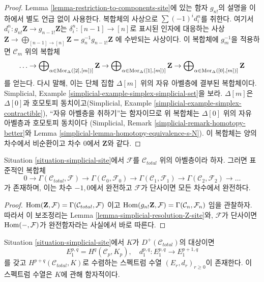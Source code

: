 \begin{proof}
Lemma \ref{lemma-restriction-to-components-site}에 있는 함자 $g_{n!}$의
설명을 이하에서 별도 언급 없이 사용한다. 복합체의 사상으로
$\sum (-1)^i d^n_i$를 취한다. 여기서
$d^n_i : g_{n!}\mathbf{Z} \to g_{n - 1!}\mathbf{Z}$는
$\delta^n_i : [n - 1] \to [n]$로 표시된 인자에 대응하는 사상
$\mathbf{Z} \to
\bigoplus_{[n - 1] \to [n]} \mathbf{Z} = g_n^{-1}g_{n - 1!}\mathbf{Z}$
에 수반되는 사상이다. 이 복합체에 $g_m^{-1}$을 적용하면
$\mathcal{C}_m$ 위의 복합체
$$
\ldots \to
\bigoplus\nolimits_{\alpha \in \mathop{\mathrm{Mor}}\nolimits_\Delta([2], [m])]} \mathbf{Z} \to
\bigoplus\nolimits_{\alpha \in \mathop{\mathrm{Mor}}\nolimits_\Delta([1], [m])]} \mathbf{Z} \to
\bigoplus\nolimits_{\alpha \in \mathop{\mathrm{Mor}}\nolimits_\Delta([0], [m])]} \mathbf{Z}
$$
를 얻는다. 다시 말해, 이는 단체 집합 $\Delta[m]$ 위의 자유 아벨층에
결부된 복합체이다. Simplicial, Example
\ref{simplicial-example-simplex-simplicial-set}을 보라.
$\Delta[m]$은 $\Delta[0]$과 호모토피 동치이고(Simplicial, Example
\ref{simplicial-example-simplex-contractible}),
“자유 아벨층을 취하기”는 함자이므로 위 복합체는
$\Delta[0]$ 위의 자유 아벨층과 호모토피 동치이다
(Simplicial, Remark \ref{simplicial-remark-homotopy-better}와
Lemma \ref{simplicial-lemma-homotopy-equivalence-s-N}).
이 복합체는 양의 차수에서 비순환이고 차수 $0$에서
$\mathbf{Z}$와 같다.
\end{proof}

\begin{lemma}
\label{lemma-cech-complex}
Situation \ref{situation-simplicial-site}에서 $\mathcal{F}$를
$\mathcal{C}_{total}$ 위의 아벨층이라 하자. 그러면 표준적인 복합체
$$
0 \to \Gamma(\mathcal{C}_{total}, \mathcal{F}) \to
\Gamma(\mathcal{C}_0, \mathcal{F}_0) \to
\Gamma(\mathcal{C}_1, \mathcal{F}_1) \to
\Gamma(\mathcal{C}_2, \mathcal{F}_2) \to \ldots
$$
가 존재하며, 이는 차수 $-1, 0$에서 완전하고
$\mathcal{F}$가 단사이면 모든 차수에서 완전하다.
\end{lemma}

\begin{proof}
$\mathop{\mathrm{Hom}}\nolimits(\mathbf{Z}, \mathcal{F}) = \Gamma(\mathcal{C}_{total}, \mathcal{F})$
이고
$\mathop{\mathrm{Hom}}\nolimits(g_{n!}\mathbf{Z}, \mathcal{F}) = \Gamma(\mathcal{C}_n, \mathcal{F}_n)$
임을 관찰하자. 따라서 이 보조정리는
Lemma \ref{lemma-simplicial-resolution-Z-site}와,
$\mathcal{F}$가 단사이면 $\mathop{\mathrm{Hom}}\nolimits(-, \mathcal{F})$가 완전함자라는 사실에서
바로 따른다.
\end{proof}

\begin{lemma}
\label{lemma-simplicial-sheaf-cohomology-site}
Situation \ref{situation-simplicial-site}에서
$K$가 $D^+(\mathcal{C}_{total})$의 대상이면
$$
E_1^{p, q} = H^q(\mathcal{C}_p, K_p),\quad
d_1^{p, q} : E_1^{p, q} \to E_1^{p + 1, q}
$$
를 갖고 $H^{p + q}(\mathcal{C}_{total}, K)$로 수렴하는 스펙트럼 수열
$(E_r, d_r)_{r \geq 0}$이 존재한다.
이 스펙트럼 수열은 $K$에 관해 함자적이다.
\end{lemma}

